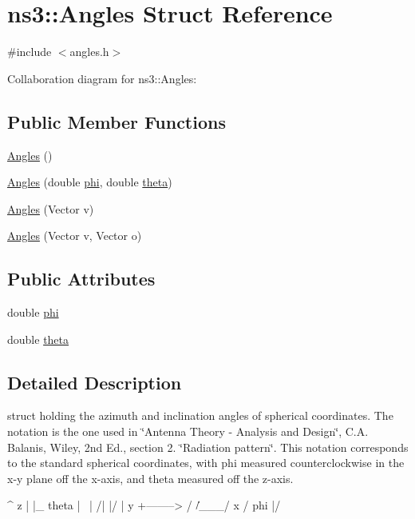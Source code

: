 \hypertarget{structns3_1_1Angles}{}\section{ns3\+:\+:Angles Struct Reference}
\label{structns3_1_1Angles}


{\ttfamily \#include $<$angles.\+h$>$}



Collaboration diagram for ns3\+:\+:Angles\+:
\subsection*{Public Member Functions}
\begin{DoxyCompactItemize}
\item 
\hyperlink{structns3_1_1Angles_a7bf49456dc58728dbcb15ab7b9b21309}{Angles} ()
\item 
\hyperlink{structns3_1_1Angles_ab994fda32e2bf1944bea05c43a221ce0}{Angles} (double \hyperlink{structns3_1_1Angles_a0585b0de17bc6d358be18e14cf294ca8}{phi}, double \hyperlink{structns3_1_1Angles_a98c2a7d6c99f9fd8504e4801a68bf291}{theta})
\item 
\hyperlink{structns3_1_1Angles_a356f4be70fec3df339b39f974a6e4edd}{Angles} (Vector v)
\item 
\hyperlink{structns3_1_1Angles_ad9c8956ad2a31ccac21e887f12acc4e3}{Angles} (Vector v, Vector o)
\end{DoxyCompactItemize}
\subsection*{Public Attributes}
\begin{DoxyCompactItemize}
\item 
double \hyperlink{structns3_1_1Angles_a0585b0de17bc6d358be18e14cf294ca8}{phi}
\item 
double \hyperlink{structns3_1_1Angles_a98c2a7d6c99f9fd8504e4801a68bf291}{theta}
\end{DoxyCompactItemize}


\subsection{Detailed Description}
struct holding the azimuth and inclination angles of spherical coordinates. The notation is the one used in \char`\"{}\+Antenna Theory -\/ Analysis
and Design\char`\"{}, C.\+A. Balanis, Wiley, 2nd Ed., section 2. \char`\"{}\+Radiation
pattern\char`\"{}. This notation corresponds to the standard spherical coordinates, with phi measured counterclockwise in the x-\/y plane off the x-\/axis, and theta measured off the z-\/axis. \begin{DoxyVerb}     ^
   z | 
     |_ theta
     | \
     | /|
     |/ |   y
     +-------->
    /  \|
   /___/
x /  phi
 |/\end{DoxyVerb}
 

